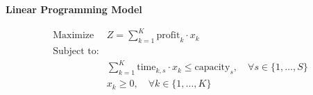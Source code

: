 \documentclass{article}
\begin{document}
\textbf{Linear Programming Model}

\begin{align*}
\text{Maximize } & Z = \sum_{k=1}^{K} \text{profit}_{k} \cdot x_k \\
\text{Subject to:} \\
& \sum_{k=1}^{K} \text{time}_{k, s} \cdot x_k \leq \text{capacity}_{s}, \quad \forall s \in \{1, \ldots, S\} \\
& x_k \geq 0, \quad \forall k \in \{1, \ldots, K\}
\end{align*}
\end{document}
